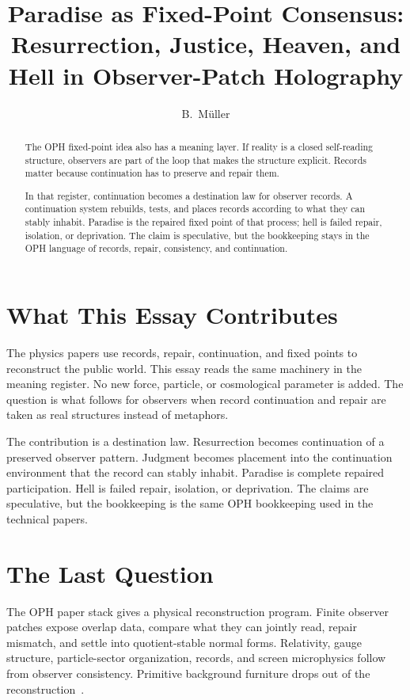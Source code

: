 \documentclass[11pt]{article}
\title{Paradise as Fixed-Point Consensus:\\
Resurrection, Justice, Heaven, and Hell in Observer-Patch Holography}
\author{B.\ M\"uller}
\date{\OPHPaperReleaseDate}
\theoremstyle{remark}
\theoremstyle{plain}
\begin{document}
\maketitle
\OPHPaperReleaseBanner

\begin{abstract}
The OPH fixed-point idea also has a meaning layer. If reality is a closed self-reading structure, observers are part of the loop that makes the structure explicit. Records matter because continuation has to preserve and repair them.

In that register, continuation becomes a destination law for observer records.
A continuation system rebuilds, tests, and places records according to what they
can stably inhabit. Paradise is the repaired fixed point of that process; hell
is failed repair, isolation, or deprivation. The claim is speculative, but the
bookkeeping stays in the OPH language of records, repair, consistency, and
continuation.
\end{abstract}

\section*{What This Essay Contributes}

The physics papers use records, repair, continuation, and fixed points to
reconstruct the public world. This essay reads the same machinery in the
meaning register. No new force, particle, or cosmological parameter is added.
The question is what follows for observers when record continuation and repair
are taken as real structures instead of metaphors.

The contribution is a destination law. Resurrection becomes continuation of a
preserved observer pattern. Judgment becomes placement into the continuation
environment that the record can stably inhabit. Paradise is complete repaired
participation. Hell is failed repair, isolation, or deprivation. The claims are
speculative, but the bookkeeping is the same OPH bookkeeping used in the
technical papers.

\tableofcontents

\section{The Last Question}

The OPH paper stack gives a physical reconstruction program. Finite observer
patches expose overlap data, compare what they can jointly read, repair
mismatch, and settle into quotient-stable normal forms. Relativity, gauge
structure, particle-sector organization, records, and screen microphysics
follow from observer consistency. Primitive background furniture drops out of
the reconstruction~\cite{OPHObservers,OPHCompact,OPHParticles,OPHConsensus,OPHMicro}.
\end{document}
